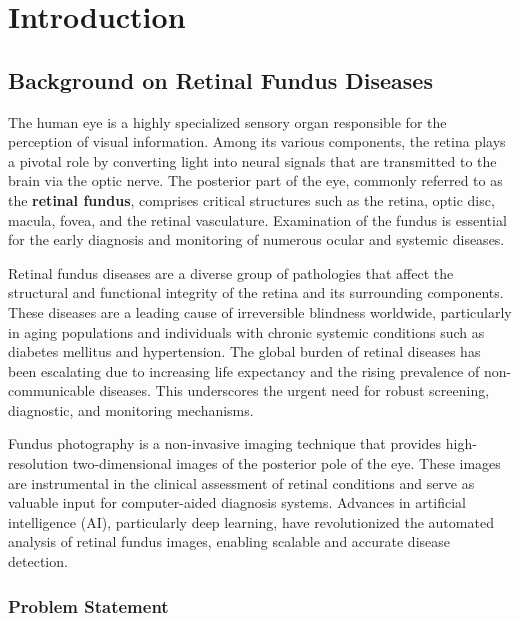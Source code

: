 \documentclass[a4paper,12pt]{report}
\begin{document}
\tableofcontents
\newpage
\chapter{Introduction}

\section{Background on Retinal Fundus Diseases}

The human eye is a highly specialized sensory organ responsible for the perception of visual information. Among its various components, the retina plays a pivotal role by converting light into neural signals that are transmitted to the brain via the optic nerve. The posterior part of the eye, commonly referred to as the \textbf{retinal fundus}, comprises critical structures such as the retina, optic disc, macula, fovea, and the retinal vasculature. Examination of the fundus is essential for the early diagnosis and monitoring of numerous ocular and systemic diseases.

Retinal fundus diseases are a diverse group of pathologies that affect the structural and functional integrity of the retina and its surrounding components. These diseases are a leading cause of irreversible blindness worldwide, particularly in aging populations and individuals with chronic systemic conditions such as diabetes mellitus and hypertension. The global burden of retinal diseases has been escalating due to increasing life expectancy and the rising prevalence of non-communicable diseases. This underscores the urgent need for robust screening, diagnostic, and monitoring mechanisms.

Fundus photography is a non-invasive imaging technique that provides high-resolution two-dimensional images of the posterior pole of the eye. These images are instrumental in the clinical assessment of retinal conditions and serve as valuable input for computer-aided diagnosis systems. Advances in artificial intelligence (AI), particularly deep learning, have revolutionized the automated analysis of retinal fundus images, enabling scalable and accurate disease detection.




\subsection{Problem Statement}
\end{document}

